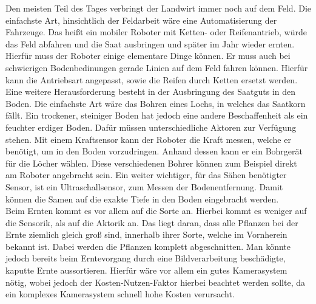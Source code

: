 Den meisten Teil des Tages verbringt der Landwirt immer noch auf dem Feld. Die
einfachste Art, hinsichtlich der Feldarbeit wäre eine Automatisierung der
Fahrzeuge. Das heißt ein mobiler Roboter mit Ketten- oder Reifenantrieb, würde
das Feld abfahren und die Saat ausbringen und später im Jahr wieder ernten. \\
Hierfür muss der Roboter einige elementare Dinge können. Er muss auch bei
schwierigen Bodenbedinungen gerade Linien auf dem Feld fahren können. Hierfür
kann die Antriebsart angepasst, sowie die Reifen durch Ketten ersetzt werden. Eine
weitere Herausforderung besteht in der Ausbringung des Saatguts in den Boden.
Die einfachste Art wäre das Bohren eines Lochs, in welches das Saatkorn fällt.
Ein trockener, steiniger Boden hat jedoch eine andere Beschaffenheit als
ein feuchter erdiger Boden. Dafür müssen unterschiedliche Aktoren zur Verfügung
stehen. Mit einem Kraftsensor kann der Roboter die Kraft messen, welche er
benötigt, um in den Boden vorzudringen. Anhand dessen kann er ein Bohrgerät für
die Löcher wählen. Diese verschiedenen Bohrer können zum Beispiel direkt am
Roboter angebracht sein.\cite{naik2016precision} Ein weiter wichtiger, für das Sähen benötigter Sensor, ist ein
Ultraschallsensor, zum Messen der Bodenentfernung. Damit können die Samen auf
die exakte Tiefe in den Boden eingebracht werden.\\ Beim Ernten kommt es
vor allem auf die Sorte an. Hierbei kommt es weniger auf die Sensorik, als auf
die Aktorik an. Das liegt daran, dass alle Pflanzen bei der Ernte ziemlich
gleich groß sind, innerhalb ihrer Sorte, welche im Vornherein bekannt ist.
Dabei werden die Pflanzen komplett abgeschnitten. Man könnte jedoch bereits
beim Erntevorgang durch eine Bildverarbeitung beschädigte, kaputte Ernte
aussortieren. Hierfür wäre vor allem ein gutes Kamerasystem nötig, wobei jedoch der Kosten-Nutzen-Faktor hierbei beachtet werden sollte, da ein komplexes Kamerasystem
schnell hohe Kosten verursacht.
